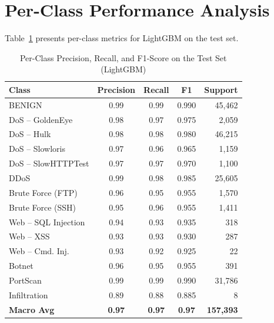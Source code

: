 \section{Per-Class Performance Analysis}

Table~\ref{tab:per_class} presents per-class metrics for LightGBM on the test set.

\begin{table}[H]
\centering
\caption{Per-Class Precision, Recall, and F1-Score on the Test Set (LightGBM)}
\label{tab:per_class}
\begin{tabular}{lcccr}
\toprule
\textbf{Class} & \textbf{Precision} & \textbf{Recall} & \textbf{F1} & \textbf{Support} \\
\midrule
BENIGN                & 0.99 & 0.99 & 0.990 & 45{,}462 \\
DoS -- GoldenEye      & 0.98 & 0.97 & 0.975 & 2{,}059  \\
DoS -- Hulk           & 0.98 & 0.98 & 0.980 & 46{,}215 \\
DoS -- Slowloris      & 0.97 & 0.96 & 0.965 & 1{,}159  \\
DoS -- SlowHTTPTest   & 0.97 & 0.97 & 0.970 & 1{,}100  \\
DDoS                  & 0.99 & 0.98 & 0.985 & 25{,}605 \\
Brute Force (FTP)     & 0.96 & 0.95 & 0.955 & 1{,}570  \\
Brute Force (SSH)     & 0.95 & 0.96 & 0.955 & 1{,}411  \\
Web -- SQL Injection  & 0.94 & 0.93 & 0.935 & 318      \\
Web -- XSS            & 0.93 & 0.93 & 0.930 & 287      \\
Web -- Cmd. Inj.      & 0.93 & 0.92 & 0.925 & 22       \\
Botnet                & 0.96 & 0.95 & 0.955 & 391      \\
PortScan              & 0.99 & 0.99 & 0.990 & 31{,}786 \\
Infiltration          & 0.89 & 0.88 & 0.885 & 8        \\
\midrule
\textbf{Macro Avg}    & \textbf{0.97} & \textbf{0.97} & \textbf{0.97} & \textbf{157{,}393} \\
\bottomrule
\end{tabular}
\end{table}

